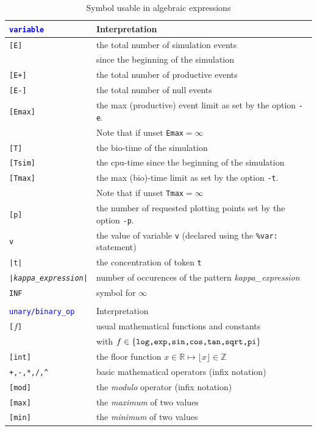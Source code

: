 \documentclass[11pt]{book}
\def\tcb#1{\textcolor{blue}{\ttt{#1}}}
\def\ttt#1{\texttt{#1}}
\def\var#1{{\textquotesingle}#1{\textquotesingle}}
\def\set#1{\{#1\}}
\def\Real{\mathbb R}
\def\Z{\mathbb Z}
\begin{document}
\begin{table}[htbp]
\centering
\caption{Symbol usable in algebraic expressions}
\begin{tabular}{@{} l|l @{} }
\toprule
\ttt{\tcb{variable}} & Interpretation \\
\midrule
\ttt{[E]} & the total number of simulation events\index{event}\\
& since the beginning of the simulation \\
\ttt{[E+]} & the total number of productive events\index{event} \\
\ttt{[E-]} & the total number of null events\index{null event}\\
\ttt{[Emax]} & the max (productive) event limit as set by the option \ttt{-e}. \\ &Note that if unset \ttt{Emax}$=\infty$\\
\ttt{[T]} & the bio-time of the simulation \\
\ttt{[Tsim]} & the cpu-time since the beginning of the simulation \\
\ttt{[Tmax]} & the max (bio)-time limit as set by the option \ttt{-t}. \\ &Note that if unset \ttt{Tmax}$=\infty$\\
\ttt{[p]} & the number of requested plotting points set by the option \ttt{-p}. \\

\ttt{\var{v}} & the value of variable \ttt{\var{v}} (declared using the \ttt{\%var:} statement) \\
\ttt{|t|} & the concentration of token \ttt{t}\\
\ttt{|\textit{kappa\_expression}|} & number of occurences of the pattern \textit{kappa\_expression}\\
\ttt{INF} & symbol for $\infty$ \\\\
\toprule
\ttt{\tcb{unary/binary\_op}} & Interpretation \\
\midrule
\ttt{[}$f$\texttt{]} & usual mathematical functions and constants \\ &with $f\in\set{\hbox{\ttt{log,exp,sin,cos,tan,sqrt,pi}}}$ \\
\ttt{[int]} & the floor function $x\in\Real\mapsto \lfloor x\rfloor\in\Z$ \\
\ttt{+,-,*,/,\textasciicircum} & basic mathematical operators (infix notation)\\
\ttt{[mod]} & the \emph{modulo} operator (infix notation)\\
\ttt{[max]} & the \emph{maximum} of two values \\
\ttt{[min]} & the \emph{minimum} of two values \\
\bottomrule
\end{tabular}
\label{tab:operators}
\end{table}
\end{document}
